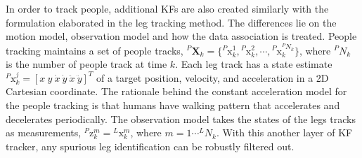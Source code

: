 \documentclass[10 pt,a4paper,conference]{IEEEtran}
\begin{document}
In order to track people, additional KFs are also created similarly with
the formulation elaborated in the leg tracking method. The differences
lie on the motion model, observation model and how the data association
is treated. People tracking maintains a set of people tracks,
\({}^P\boldsymbol{X}_k=\lbrace {}^P\boldsymbol{\mathrm{x}}^1_k, {}^P\boldsymbol{\mathrm{x}}^2_k,\dotsb,{}^P\boldsymbol{\mathrm{x}}^{{}^PN_k}_k \rbrace\),
where \({}^PN_k\) is the number of people track at time \(k\). Each leg
track has a state estimate
\({}^P\boldsymbol{\mathrm{x}}^j_k=[ x \: y \: \dot{x} \: \dot{y} \: \ddot{x} \: \ddot{y} ]^T\)
of a target position, velocity, and acceleration in a 2D Cartesian
coordinate. The rationale behind the constant acceleration model for the
people tracking is that humans have walking pattern that accelerates and
decelerates periodically. The observation model takes the states of the
legs tracks as measurements,
\({}^P\boldsymbol{\mathrm{z}}^m_k={}^L\boldsymbol{\mathrm{x}}^m_k\),
where \(m=1 \dotsb {}^LN_k\). With this another layer of KF tracker, any
spurious leg identification can be robustly filtered out.
\end{document}
